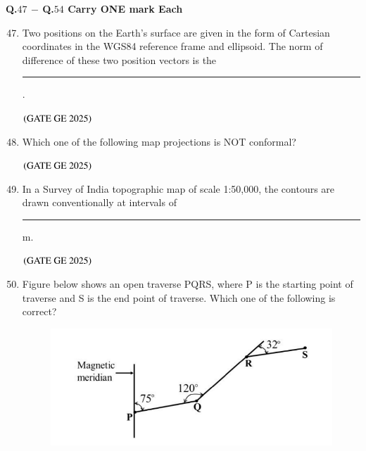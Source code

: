 \documentclass[journal,12pt,onecolumn]{IEEEtran}
\theoremstyle{remark}
\begin{document}
\textbf{Q.$47$ $-$ Q.$54$ Carry ONE mark Each}\\
\begin{enumerate}
\setcounter{enumi}{46}
\item Two positions on the Earth's surface are given in the form of Cartesian coordinates in the WGS84 reference frame and ellipsoid. The norm of difference of these two position vectors is the\rule{2cm}{0.5mm}.
\begin{enumerate}
\end{enumerate}
\hfill $\left(\text{GATE GE 2025}\right)$
\bigskip
\item Which one of the following map projections is NOT conformal?
\begin{enumerate}
\end{enumerate}
\hfill $\left(\text{GATE GE 2025}\right)$
\bigskip
\item In a Survey of India topographic map of scale 1:50,000, the contours are drawn conventionally at intervals of \rule{2cm}{0.5mm} m.
\begin{enumerate}
\end{enumerate}
\hfill $\left(\text{GATE GE 2025}\right)$
\bigskip
\item Figure below shows an open traverse PQRS, where P is the starting point of traverse and S is the end point of traverse. Which one of the following is correct?
\begin{figure}[H]
    \centering
    \includegraphics[width=0.4\columnwidth]{figs/fig8.png}

\end{figure}
\end{enumerate}
\end{document}
